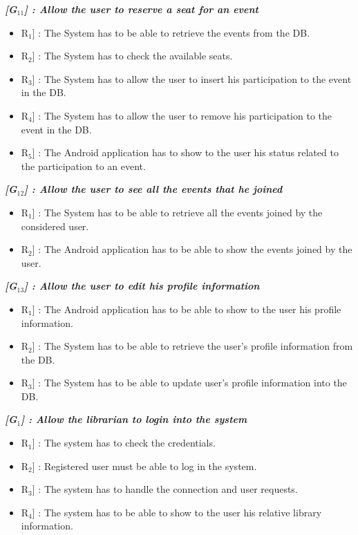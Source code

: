 \vspace{0.5cm}
\noindent
\emph{\textbf{[G$_{11}$] : Allow the user to reserve a seat for an event}}
\begin{itemize}
	\setlength{\leftskip}{0.5cm}
	\item \lbrack R$_{1}$] : The System has to be able to retrieve the events from the DB.
	\item \lbrack R$_{2}$] : The System has to check the available seats.
	\item \lbrack R$_{3}$] : The System has to allow the user to insert his participation to the event in the DB.
	\item \lbrack R$_{4}$] : The System has to allow the user to remove his participation to the event in the DB.
	\item \lbrack R$_{5}$] : The Android application has to show to the user his status related to the participation to an event.
\end{itemize}

\vspace{0.5cm}
\noindent
\emph{\textbf{[G$_{12}$] : Allow the user to see all the events that he joined}}
\begin{itemize}
	\setlength{\leftskip}{0.5cm}
	\item \lbrack R$_{1}$] : The System has to be able to retrieve all the events joined by the considered user.
	\item \lbrack R$_{2}$] : The Android application has to be able to show the events joined by the user.
\end{itemize}

\newpage
\noindent
\emph{\textbf{[G$_{13}$] : Allow the user to edit his profile information}}
\begin{itemize}
	\setlength{\leftskip}{0.5cm}
	\item \lbrack R$_{1}$] : The Android application has to be able to show to the user his profile information.
	\item \lbrack R$_{2}$] : The System has to be able to retrieve the user’s profile information from the DB.
	\item \lbrack R$_{3}$] : The System has to be able to update user’s profile information into the DB.
\end{itemize}

\vspace{0.8cm}
\vspace{0.5cm}
\noindent
\emph{\textbf{[G$_{1}$] : Allow the librarian to login into the system}}
\begin{itemize}
	\setlength{\leftskip}{0.5cm}
	\item \lbrack R$_{1}$] : The system has to check the credentials.
	\item \lbrack R$_{2}$] : Registered user must be able to log in the system.
	\item \lbrack R$_{3}$] : The system has to handle the connection and user requests.
	\item \lbrack R$_{4}$] : The system has to be able to show to the user his relative library information.
\end{itemize}

